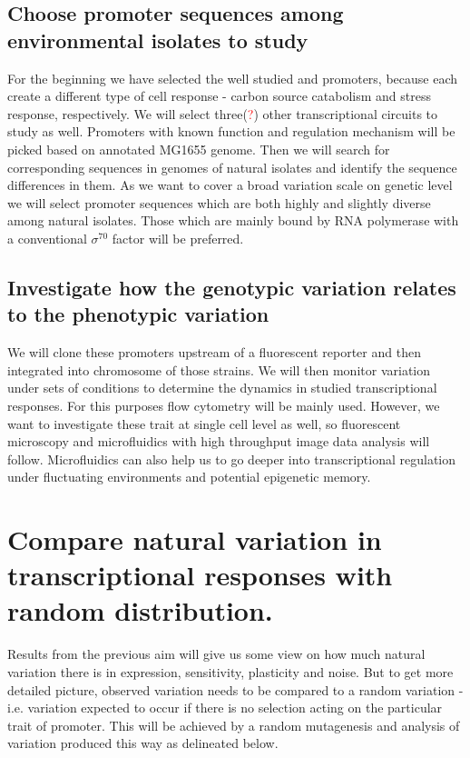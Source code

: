\subsection{Choose promoter sequences among environmental  isolates to study}
For the beginning we have selected the well studied  and  promoters, because each create a different type of cell response - carbon source catabolism and stress response, respectively.
We will select three(\textcolor{red}{?}) other transcriptional circuits to study as well.
Promoters with known function and regulation mechanism will be picked based on annotated MG1655 genome.
Then we will search for corresponding sequences in genomes of natural isolates and identify the sequence differences in them.
As we want to cover a broad variation scale on genetic level we will select promoter sequences which are both highly and slightly diverse among natural isolates.
Those which are mainly bound by RNA polymerase with a conventional $\sigma^{70}$ factor will be preferred.

\subsection{Investigate how the genotypic variation relates to the phenotypic variation}
We will clone these promoters upstream of a fluorescent reporter and then integrated into chromosome of those strains.
We will then monitor variation under sets of conditions to determine the dynamics in studied transcriptional responses.
For this purposes flow cytometry will be mainly used.
However, we want to investigate these trait at single cell level as well, so fluorescent microscopy and microfluidics with high throughput image data analysis will follow.
Microfluidics can also help us to go deeper into transcriptional regulation under fluctuating environments and potential epigenetic memory.


\section{Compare natural variation in transcriptional responses with random distribution.}
Results from the previous aim will give us some view on how much natural variation there is in expression, sensitivity, plasticity and noise.
But to get more detailed picture, observed variation needs to be compared to a random variation - i.e. variation expected to occur if there is no selection acting on the particular trait of promoter.
This will be achieved by a random mutagenesis and analysis of variation produced this way as delineated below.

